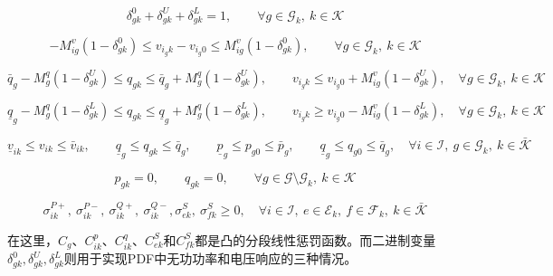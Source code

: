 \documentclass{article}
\begin{document}
\begin{equation}
\delta_{gk}^{0} + \delta_{gk}^{U} + \delta_{gk}^{L} = 1,
\qquad \forall g \in \mathcal{G}_k,\ k \in \mathcal{K}
\tag{2.1o$'$}
\end{equation}

\begin{equation}
-M_{ig}^{v}(1-\delta_{gk}^{0})
\le v_{i_g k} - v_{i_g 0}
\le M_{ig}^{v}(1-\delta_{gk}^{0}),
\qquad \forall g \in \mathcal{G}_k,\ k \in \mathcal{K}
\tag{2.1o$''$}
\end{equation}

\begin{equation}
\bar{q}_g - M_g^q(1-\delta_{gk}^{U})
\le q_{gk}
\le \bar{q}_g + M_g^q(1-\delta_{gk}^{U}),
\qquad
v_{i_g k} \le v_{i_g 0} + M_{ig}^{v}(1-\delta_{gk}^{U}),
\quad \forall g \in \mathcal{G}_k,\ k \in \mathcal{K}
\tag{2.1o$'''$}
\end{equation}

\begin{equation}
\underline{q}_g - M_g^q(1-\delta_{gk}^{L})
\le q_{gk}
\le \underline{q}_g + M_g^q(1-\delta_{gk}^{L}),
\qquad
v_{i_g k} \ge v_{i_g 0} - M_{ig}^{v}(1-\delta_{gk}^{L}),
\quad \forall g \in \mathcal{G}_k,\ k \in \mathcal{K}
\tag{2.1o$''''$}
\end{equation}

\begin{equation}
\underline{v}_{ik} \le v_{ik} \le \bar{v}_{ik},
\qquad
\underline{q}_g \le q_{gk} \le \bar{q}_g,
\qquad
\underline{p}_g \le p_{g0} \le \bar{p}_g,
\qquad
\underline{q}_g \le q_{g0} \le \bar{q}_g,
\quad \forall i \in \mathcal{I},\ g \in \mathcal{G}_k,\ k \in \bar{\mathcal{K}}
\tag{2.1p}
\end{equation}

\begin{equation}
p_{gk} = 0, \qquad q_{gk} = 0,
\qquad \forall g \in \mathcal{G} \setminus \mathcal{G}_k,\ k \in \mathcal{K}
\tag{2.1q}
\end{equation}

\begin{equation}
\sigma_{ik}^{P+},\ \sigma_{ik}^{P-},\ \sigma_{ik}^{Q+},\ \sigma_{ik}^{Q-},
\sigma_{ek}^{S},\ \sigma_{fk}^{S} \ge 0,
\quad
\forall i \in \mathcal{I},\ e \in \mathcal{E}_k,\ f \in \mathcal{F}_k,\ k \in \bar{\mathcal{K}}
\tag{2.1r}
\end{equation}

在这里，$C_g$、$C_{ik}^{p}$、$C_{ik}^{q}$、$C_{ek}^{S}$和$C_{fk}^{S}$都是凸的分段线性惩罚函数。而二进制变量$\delta_{gk}^{0}, \delta_{gk}^{U}, \delta_{gk}^{L}$则用于实现PDF中无功功率和电压响应的三种情况。
\end{document}
